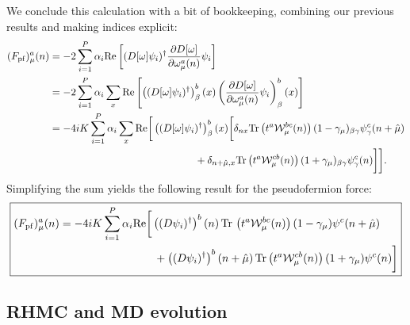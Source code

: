 We conclude this calculation with a bit of bookkeeping, combining our previous results and making indices explicit:
\begin{align}\begin{split}
	(F_\mathrm{pf})_\mu^a(n) &= -2\sum_{i = 1}^P \alpha_i \mathrm{Re} \left[  (D[\omega] \psi_i )^\dagger \frac{\partial D[\omega]}{\partial\omega_\mu^a(n)} \psi_i \right] \\
	&= -2\sum_{i = 1}^P \alpha_i \sum_{x} \mathrm{Re} \left[  \left((D[\omega] \psi_i )^\dagger \right)_\beta^b(x) \left( \frac{\partial D[\omega]}{\partial\omega_\mu^a(n)} \psi_i \right)_\beta^b(x) \right] \\
	&= -4iK\sum_{i = 1}^P \alpha_i \sum_{x} \mathrm{Re} \bigg[  \left((D[\omega] \psi_i )^\dagger \right)_\beta^b(x) \bigg[ \delta_{nx} \Tr \left( t^a \mathcal W_\mu^{bc}(n) \right) (1 - \gamma_\mu)_{\beta\gamma} \psi_\gamma^c(n + \hat\mu) \\
	&\hspace{5cm} + \delta_{n + \hat\mu, x} \Tr\left( t^a \mathcal W_\mu^{cb}(n) \right) (1 + \gamma_\mu)_{\beta\gamma} \psi_\gamma^c(n) \bigg] \bigg] .
\end{split}\end{align}
Simplifying the sum yields the following result for the pseudofermion force:
\begin{equation}
\boxed{
	\begin{split}
		(F_\mathrm{pf})_\mu^a(n) &= -4iK \sum_{i = 1}^P \alpha_i \mathrm{Re}\bigg[ \left((D\psi_i )^\dagger \right)^b(n) \,\Tr\,\left( t^a \mathcal W_\mu^{bc} (n) \right) (1 - \gamma_\mu) \psi^c(n + \hat\mu) \\ &\hspace{3cm}+ \left((D\psi_i )^\dagger \right)^b(n + \hat\mu) \, \Tr\left( t^a \mathcal W_\mu^{cb}(n) \right) (1 + \gamma_\mu) \psi^c(n) \bigg]
	\end{split}
}
\end{equation}


\subsection{RHMC and MD evolution}

